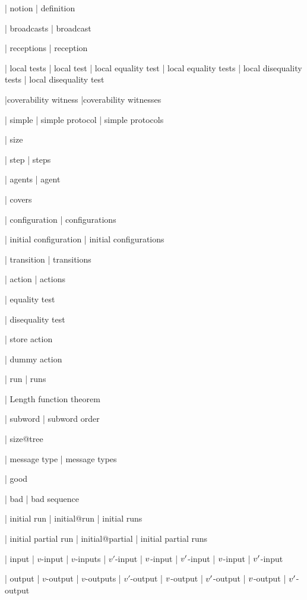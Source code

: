 | notion
| definition


| broadcasts
| broadcast

| receptions
| reception

| local tests
| local test
| local equality test
| local equality tests
| local disequality tests
| local disequality test

|coverability witness
|coverability witnesses

| simple
| simple protocol
| simple protocols

| size

| step
| steps

| agents
| agent

| covers

| configuration
| configurations

| initial configuration
| initial configurations

| transition
| transitions

| action
| actions

| equality test

| disequality test

| store action

| dummy action


| run
| runs

| Length function theorem

| subword 
| subword order


| size@tree 

| message type
| message types

| good

| bad
| bad sequence

| initial run
| initial@run
| initial runs

| initial partial run
| initial@partial
| initial partial runs

| input
| $v$-input
| $v$-inputs
| $v'$-input
| $v$-input
| $v'$-input
| $v$-input
| $v'$-input

| output
| $v$-output
| $v$-outputs
| $v'$-output
| $v$-output
| $v'$-output
| $v$-output
| $v'$-output

